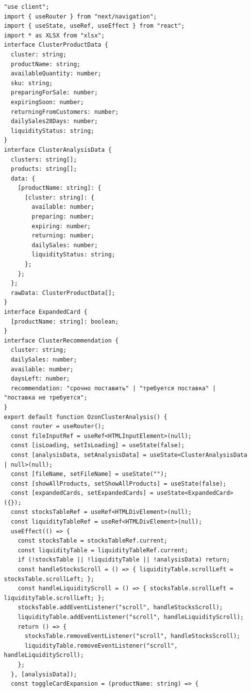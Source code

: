 \begin{code}
\vspace{-0.75cm}\begin{verbatim}
"use client";
import { useRouter } from "next/navigation";
import { useState, useRef, useEffect } from "react";
import * as XLSX from "xlsx";
interface ClusterProductData {
  cluster: string;
  productName: string;
  availableQuantity: number;
  sku: string;
  preparingForSale: number;
  expiringSoon: number;
  returningFromCustomers: number;
  dailySales28Days: number;
  liquidityStatus: string;
}
interface ClusterAnalysisData {
  clusters: string[];
  products: string[];
  data: {
    [productName: string]: {
      [cluster: string]: {
        available: number;
        preparing: number;
        expiring: number;
        returning: number;
        dailySales: number;
        liquidityStatus: string;
      };
    };
  };
  rawData: ClusterProductData[];
}
interface ExpandedCard {
  [productName: string]: boolean;
}
interface ClusterRecommendation {
  cluster: string;
  dailySales: number;
  available: number;
  daysLeft: number;
  recommendation: "срочно поставить" | "требуется поставка" | "поставка не требуется";
}
export default function OzonClusterAnalysis() {
  const router = useRouter();
  const fileInputRef = useRef<HTMLInputElement>(null);
  const [isLoading, setIsLoading] = useState(false);
  const [analysisData, setAnalysisData] = useState<ClusterAnalysisData | null>(null);
  const [fileName, setFileName] = useState("");
  const [showAllProducts, setShowAllProducts] = useState(false);
  const [expandedCards, setExpandedCards] = useState<ExpandedCard>({});
  const stocksTableRef = useRef<HTMLDivElement>(null);
  const liquidityTableRef = useRef<HTMLDivElement>(null);
  useEffect(() => {
    const stocksTable = stocksTableRef.current;
    const liquidityTable = liquidityTableRef.current;
    if (!stocksTable || !liquidityTable || !analysisData) return;
    const handleStocksScroll = () => { liquidityTable.scrollLeft = stocksTable.scrollLeft; };
    const handleLiquidityScroll = () => { stocksTable.scrollLeft = liquidityTable.scrollLeft; };
    stocksTable.addEventListener("scroll", handleStocksScroll);
    liquidityTable.addEventListener("scroll", handleLiquidityScroll);
    return () => {
      stocksTable.removeEventListener("scroll", handleStocksScroll);
      liquidityTable.removeEventListener("scroll", handleLiquidityScroll);
    };
  }, [analysisData]);
  const toggleCardExpansion = (productName: string) => {

\end{verbatim}
\end{code}
